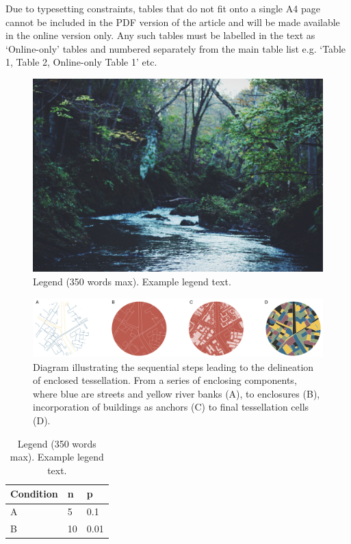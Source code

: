 \documentclass[fleqn,10pt]{wlscirep}
\begin{document}
Due to typesetting constraints, tables that do not fit onto a single A4 page cannot be
included in the PDF version of the article and will be made available in the online
version only. Any such tables must be labelled in the text as ‘Online-only’ tables and
numbered separately from the main table list e.g. ‘Table 1, Table 2, Online-only Table
1’ etc.

\begin{figure}[ht]
\centering
\includegraphics[width=\linewidth]{stream}
\caption{Legend (350 words max). Example legend text.}
\label{fig:stream}
\end{figure}

\begin{figure}
    \includegraphics[width=\linewidth]{fig/et_diagram.pdf}
    \caption{Diagram illustrating the sequential steps leading to the delineation of
    enclosed tessellation. From a series of enclosing components, where blue are streets
    and yellow river banks (A), to enclosures (B), incorporation of buildings as anchors
    (C) to final tessellation cells (D).}
    \label{fig:et_diagram}
\end{figure}

\begin{table}[ht]
\centering
\begin{tabular}{|l|l|l|}
\hline
Condition & n & p \\
\hline
A & 5 & 0.1 \\
\hline
B & 10 & 0.01 \\
\hline
\end{tabular}
\caption{\label{tab:example}Legend (350 words max). Example legend text.}
\end{table}
\end{document}
